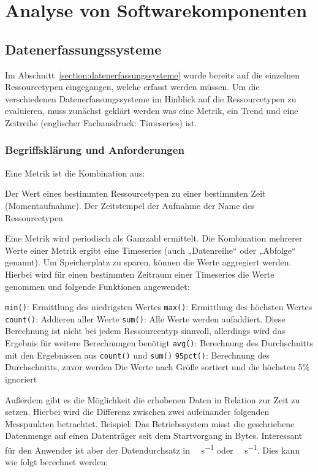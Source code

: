 \chapter{Analyse von Softwarekomponenten}
\section{Datenerfassungssysteme}
Im Abschnitt~\ref{section:datenerfassungssysteme} wurde bereits auf die
einzelnen Ressourcetypen eingegangen, welche erfasst werden müssen. Um die
verschiedenen Datenerfassungssysteme im Hinblick auf die Ressourcetypen zu
evaluieren, muss zunächst geklärt werden was eine Metrik, ein Trend und eine
Zeitreihe (englischer Fachausdruck: Timeseries) ist.
\tm%

\subsection{Begriffsklärung und Anforderungen}
\label{section:Begriffserklärung}
Eine Metrik ist die Kombination aus:

\begin{outline}
  \1 Der Wert eines bestimmten Ressourcetypen zu einer bestimmten Zeit
  (Momentaufnahme).
  \1 Der Zeitstempel der Aufnahme
  \1 der Name des Ressourcetypen
\end{outline}

Eine Metrik wird periodisch als Ganzzahl ermittelt. Die Kombination mehrerer
Werte einer Metrik ergibt eine Timeseries (auch „Datenreihe“ oder „Abfolge“
genannt). Um Speicherplatz zu sparen, können die Werte aggregiert werden.
Hierbei wird für einen bestimmten Zeitraum einer Timeseries die Werte genommen
und folgende Funktionen angewendet:

\begin{outline}
  \1 \lstinline|min()|: Ermittlung des niedrigsten Wertes
  \1 \lstinline|max()|: Ermittlung des höchsten Wertes
  \1 \lstinline|count()|: Addieren aller Werte
  \1 \lstinline|sum()|: Alle Werte werden aufaddiert. Diese Berechnung ist nicht
  bei jedem Ressourcentyp sinnvoll, allerdings wird das Ergebnis für weitere
  Berechnungen benötigt
  \1 \lstinline|avg()|: Berechnung des Durchschnitts mit den Ergebnissen aus
  \lstinline|count()| und \lstinline|sum()|
  \1 \lstinline|95pct()|: Berechnung des Durchschnitts, zuvor werden Die Werte
  nach Größe sortiert und die höchsten 5\% ignoriert
\end{outline}

Außerdem gibt es die Möglichkeit die erhobenen Daten in Relation zur Zeit zu
setzen. Hierbei wird die Differenz zwischen zwei aufeinander folgenden
Messpunkten betrachtet.  Beispiel: Das Betriebssystem misst die geschriebene
Datenmenge auf einen Datenträger seit dem Startvorgang in Bytes. Interessant
für den Anwender ist aber der Datendurchsatz in \si{\mega\byte\per\second} oder
\si{\giga\byte\per\second}. Dies kann wie folgt berechnet werden:

